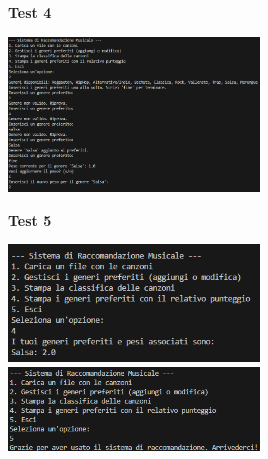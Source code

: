 \documentclass[a4paper,11pt]{article}
\begin{document}
\newpage
\begin{center}
    \textbf{Test 4}
    \par
    \vspace{0.5cm}
    \includegraphics[width=0.5\textwidth]{htest4}
\end{center}
\begin{center}
    \textbf{Test 5}
    \par
    \vspace{0.5cm}
    \includegraphics[width=0.5\textwidth]{htest5}
    \includegraphics[width=0.5\textwidth]{htest10}
\end{center}
\end{document}
